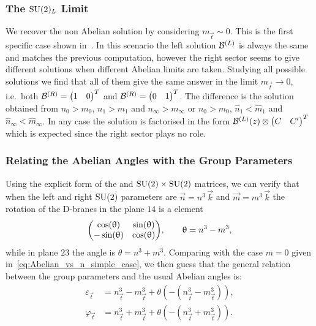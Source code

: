 \subsubsection{The \texorpdfstring{$\mathrm{SU}(2)_L$}{Left SU(2)} Limit}

We recover the non Abelian  solution by considering $m_{\vec{t}}\sim 0$.
This is the first specific case shown in~.
In this scenario the left solution $\mathcal{B}^{(L)}$ is always the same and matches the previous computation, however the right sector seems to give different solutions when different Abelian limits are taken.
Studying all possible solutions we find that all of them give the same answer in the limit $m_{\vec{t}} \to 0$, i.e.\ both $\cB^{(R)} = \mqty(1 & 0)^T$ and $\cB^{(R)} = \mqty(0 & 1)^T$.\footnotemark{}
The difference is the solution obtained from $n_{0} > m_{0}$, $n_{1} > m_{1}$ and $n_{\infty} > m_{\infty}$ or $n_{0} > m_{0}$, $\hat{n}_{1} < \hat{m}_{1}$ and $\hat{n}_{\infty} < \hat{m}_{\infty}$.
In any case the solution is factorised in the form $\cB^{(L)}(z) \otimes \mqty(C & C')^T$ which is expected since the right sector plays no role.


\subsubsection{Relating the Abelian Angles with the Group Parameters}

Using the explicit form of the  and $\mathrm{SU}(2) \times \mathrm{SU}(2)$ matrices, we can verify that when the left and right $\mathrm{SU}(2)$ parameters are $\vec{n} = n^3\, \vec{k}$ and $\vec{m} = m^3\, \vec{k}$ the rotation of the D-branes in the plane $14$ is a  element
\begin{equation}
  \mqty( \cos(\theta) & \sin(\theta) \\ -\sin(\theta)&  \cos(\theta) ),
  \qquad
  \theta = n^3 - m^3,
\end{equation}
while in plane $23$ the angle is $\theta = n^3 + m^3$.
Comparing with the case $m = 0$ given in~\eqref{eq:Abelian_vs_n_simple_case}, we then guess that the general relation between the group parameters and the usual Abelian angles is:
\begin{equation}
  \begin{split}
    \varepsilon_{\vec{t}}
    & =
    n_{\vec{t}}^3 - m_{\vec{t}}^3 + \theta( -(n^3_{\vec{t}} - m_{\vec{t}}^3) ),
    \\
    \varphi_{\vec{t}}
    & =
    n_{\vec{t}}^3 + m_{\vec{t}}^3 + \theta( -(n^3_{\vec{t}} + m_{\vec{t}}^3) ).
  \end{split}
  \label{eq:Abelian_vs_n_general_case}
\end{equation}


